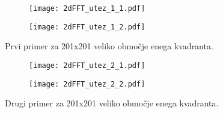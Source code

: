 \documentclass[12pt,a4paper]{article}
\begin{document}
\begin{figure}[H]
    \centering
    \begin{subfigure}[b]{0.5\textwidth}  			
        \texttt{[image: 2dFFT\_utez\_1\_1.pdf]}
    \end{subfigure}
    \begin{subfigure}[b]{0.45\textwidth}  			
        \texttt{[image: 2dFFT\_utez\_1\_2.pdf]}     
    \end{subfigure}
    \caption{Prvi primer za 201x201 veliko območje enega kvadranta.} \label{fig:slika8}
\end{figure}

\begin{figure}[H]
    \centering
    \begin{subfigure}[b]{0.5\textwidth}  			
        \texttt{[image: 2dFFT\_utez\_2\_1.pdf]}
    \end{subfigure}
    \begin{subfigure}[b]{0.45\textwidth}  			
        \texttt{[image: 2dFFT\_utez\_2\_2.pdf]}     
    \end{subfigure}
    \caption{Drugi primer za 201x201 veliko območje enega kvadranta.} \label{fig:slika9}
\end{figure}
\end{document}
